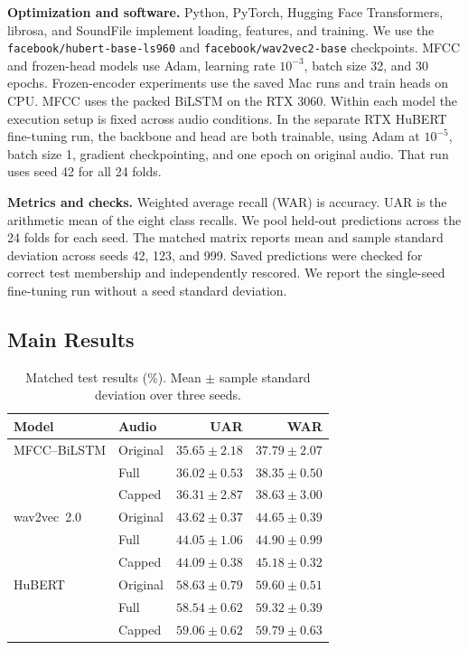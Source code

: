 \documentclass[11pt, letterpaper]{article}
\begin{document}
\textbf{Optimization and software.} Python, PyTorch, Hugging Face Transformers, librosa, and SoundFile implement loading, features, and training. We use the \texttt{facebook/hubert-base-ls960} and \texttt{facebook/wav2vec2-base} checkpoints. MFCC and frozen-head models use Adam, learning rate $10^{-3}$, batch size 32, and 30 epochs. Frozen-encoder experiments use the saved Mac runs and train heads on CPU. MFCC uses the packed BiLSTM on the RTX 3060. Within each model the execution setup is fixed across audio conditions. In the separate RTX HuBERT fine-tuning run, the backbone and head are both trainable, using Adam at $10^{-5}$, batch size 1, gradient checkpointing, and one epoch on original audio. That run uses seed 42 for all 24 folds.

\textbf{Metrics and checks.} Weighted average recall (WAR) is accuracy. UAR is the arithmetic mean of the eight class recalls. We pool held-out predictions across the 24 folds for each seed. The matched matrix reports mean and sample standard deviation across seeds 42, 123, and 999. Saved predictions were checked for correct test membership and independently rescored. We report the single-seed fine-tuning run without a seed standard deviation.

\clearpage
\subsection{Main Results}
\begin{table}[h!]
\centering
\caption{Matched test results (\%). Mean $\pm$ sample standard deviation over three seeds.}
\label{tab:main}
\begin{tabular}{@{}llrr@{}}
\toprule
Model & Audio & UAR & WAR \\
\midrule
MFCC--BiLSTM & Original & $35.65\pm2.18$ & $37.79\pm2.07$ \\
 & Full & $36.02\pm0.53$ & $38.35\pm0.50$ \\
 & Capped & $\mathbf{36.31}\pm2.87$ & $\mathbf{38.63}\pm3.00$ \\
wav2vec~2.0 & Original & $43.62\pm0.37$ & $44.65\pm0.39$ \\
 & Full & $44.05\pm1.06$ & $44.90\pm0.99$ \\
 & Capped & $\mathbf{44.09}\pm0.38$ & $\mathbf{45.18}\pm0.32$ \\
HuBERT & Original & $58.63\pm0.79$ & $59.60\pm0.51$ \\
 & Full & $58.54\pm0.62$ & $59.32\pm0.39$ \\
 & Capped & $\mathbf{59.06}\pm0.62$ & $\mathbf{59.79}\pm0.63$ \\
\bottomrule
\end{tabular}
\end{table}
\end{document}
